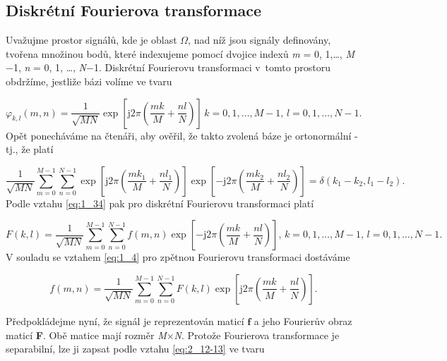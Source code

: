 \subsection*{Diskrétní Fourierova transformace}

\noindent Uvažujme prostor signálů, kde je oblast $\Omega$, nad níž jsou signály definovány, tvořena množinou bodů, které indexujeme pomocí dvojice indexů \textit{m} = 0, 1,\dots, \textit{M}$-$1,  \textit{n} = 0, 1, \dots, \textit{N}$-$1. Diskrétní Fourierovu transformaci v~tomto prostoru obdržíme, jestliže bázi volíme ve tvaru

\begin{equation} \label{eq:2_37}
    \varphi_{k,l}(m, n) = \frac{1}{\sqrt{MN}} \exp \left[ \mathrm{j} 2 \pi \left( \frac{mk}{M} + \frac{nl}{N} \right) \right] \, k = 0, 1, \dots, M-1, \,l = 0, 1, \dots, N-1.
\end{equation}
Opět ponecháváme na čtenáři, aby ověřil, že takto zvolená báze je ortonormální - tj., že platí

\begin{equation} \label{eq:2_38}
    \frac{1}{\sqrt{MN}} \sum\limits_{m=0}^{M-1} \sum\limits_{n=0}^{N-1} \exp \left[ \mathrm{j} 2 \pi \left( \frac{mk_1}{M} + \frac{nl_1}{N} \right) \right] \exp \left[ - \mathrm{j} 2 \pi \left( \frac{mk_2}{M} + \frac{nl_2}{N} \right) \right] = \delta( k_1 - k_2, l_1 - l_2 ).
\end{equation}
Podle vztahu \eqref{eq:1_34} pak pro diskrétní Fourierovu transformaci platí

\begin{equation} \label{eq:2_39}
    F(k, l) = \frac{1}{\sqrt{MN}} \sum\limits_{m=0}^{M-1} \sum\limits_{n=0}^{N-1} f(m, n) \exp \left[ - \mathrm{j} 2 \pi \left( \frac{mk}{M} + \frac{nl}{N} \right) \right],\, k = 0, 1, \dots, M-1,\, l = 0, 1, \dots, N-1.
\end{equation}
V souladu se vztahem \eqref{eq:1_4} pro zpětnou Fourierovu transformaci dostáváme

\begin{equation} \label{eq:2_40}
    f(m, n) = \frac{1}{\sqrt{MN}} \sum\limits_{m=0}^{M-1} \sum\limits_{n=0}^{N-1} F(k, l) \exp \left[ \mathrm{j} 2 \pi \left( \frac{mk}{M} + \frac{nl}{N} \right) \right].
\end{equation}

\noindent Předpokládejme nyní, že signál je reprezentován maticí $\mathbf{f}$ a jeho Fourierův obraz maticí \textbf{F}. Obě matice mají rozměr \textit{M}$\times$\textit{N}. Protože Fourierova transformace je separabilní, lze ji zapsat podle vztahu \eqref{eq:2_12-13} ve tvaru

